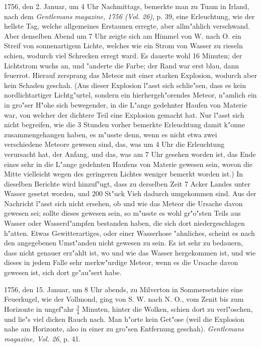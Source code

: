 \documentclass[a4paper, 11pt, oneside, polutonikogreek, german]{article}
\begin{document}
1756, den 2. Januar, um 4 Uhr Nachmittags, bemerkte man zu Tuam in Irland, nach dem \emph{Gentlemans magazine, 1756 (Vol. 26)}, p. 39, eine Erleuchtung, wie der hellste Tag, welche allgemeines Erstaunen erregte, aber allm"ahlich verschwand. Aber denselben Abend um 7 Uhr zeigte sich am Himmel von W. nach O. ein Streif von sonnenartigem Lichte, welches wie ein Strom von Wasser zu rieseln schien, wodurch viel Schrecken erregt ward. Es dauerte wohl 16 Minuten; der Lichtstrom wuchs an, und "anderte die Farbe; der Rand war erst blau, dann feuerrot. Hierauf zersprang das Meteor mit einer starken Explosion, wodurch aber kein Schaden geschah. (Aus dieser Explosion l"asst sich schlie"sen, dass es kein nordlichtartiger Lichtg"urtel, sondern ein hierhergeh"orendes Meteor, n"amlich ein in gro"ser H"ohe sich bewegender, in die L"ange gedehnter Haufen von Materie war, von welcher der dichtere Teil eine Explosion gemacht hat. Nur l"asst sich nicht begreifen, wie die 3 Stunden vorher bemerkte Erleuchtung damit k"onne zusammengehangen haben, es m"usste denn, wenn es nicht etwa zwei verschiedene Meteore gewesen sind, das, was um 4 Uhr die Erleuchtung verursacht hat, der Anfang, und das, was am 7 Uhr gesehen worden ist, das Ende eines sehr in die L"ange gedehnten Haufens von Materie gewesen sein, wovon die Mitte vielleicht wegen des geringeren Lichtes weniger bemerkt worden ist.) In dieselben Berichte wird hinzuf"ugt, dass zu derselben Zeit 7 Acker Landes unter Wasser gesetzt worden, und 200 St"uck Vieh dadurch umgekommen sind. Aus der Nachricht l"asst sich nicht ersehen, ob und wie das Meteor die Ursache davon gewesen sei; sollte dieses gewesen sein, so m"usste es wohl gr"o"sten Teils aus Wasser oder Wasserd"ampfen bestanden haben, die sich dort niedergeschlagen h"atten. Etwas Gewitterartiges, oder einer Wasserhose "ahnliches, scheint es nach den angegebenen Umst"anden nicht gewesen zu sein. Es ist sehr zu bedauern, dass nicht genauer erz"ahlt ist, wo und wie das Wasser hergekommen ist, und wie dieses in jedem Falle sehr merkw"urdige Meteor, wenn es die Ursache davon gewesen ist, sich dort ge"au"sert habe.

1756, den 15. Januar, um 8 Uhr abends, zu Milverton in Sommersetshire eine Feuerkugel, wie der Vollmond, ging von S. W. nach N. O., vom Zenit bis zum Horizonte in ungef"ahr $\mathfrak{\frac{3}{4}}$ Minuten, hinter die Wolken, schien dort zu verl"oschen, und lie"s viel dicken Rauch nach. Man h"orte kein Get"ose (weil die Explosion nahe am Horizonte, also in einer zu gro"sen Entfernung geschah). \emph{Gentlemans magazine, Vol. 26}, p. 41.
\end{document}
